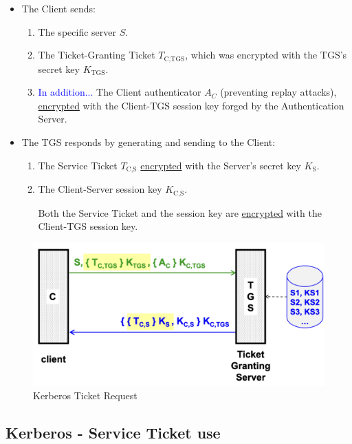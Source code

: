 \begin{itemize}
    \item The Client sends:
    \begin{enumerate}
        \item The specific server $S$.
        \item The Ticket-Granting Ticket $T_{\text{C,TGS}}$, which was encrypted with the TGS's secret key $K_{\text{TGS}}$.
        \item \textcolor{Blue}{In addition...} The Client authenticator $A_C$ (preventing replay attacks), \underline{encrypted} with the Client-TGS session key forged by the Authentication Server.
    \end{enumerate} 
    \item The TGS responds by generating and sending to the Client:
    \begin{enumerate}
        \item The Service Ticket $T_{\text{C,S}}$ \underline{encrypted} with the Server's secret key $K_{\text{S}}$.
        \item The Client-Server session key $K_{\text{C,S}}$.
        
        \begin{center}
            Both the Service Ticket and the session key are \underline{encrypted} with the Client-TGS session key.

        \end{center}
    \end{enumerate}
\end{itemize}

\begin{figure}[H]
    \centering
    \includegraphics[width=0.5\linewidth]{Images/Authentication/kerticketreq.png}
    \caption{Kerberos Ticket Request}
\end{figure}

\subsection*{Kerberos - Service Ticket use}

